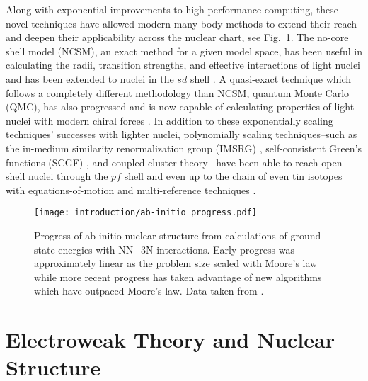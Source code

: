 \documentclass[../thesis.tex]{subfiles}
\begin{document}
Along with exponential improvements to high-performance computing, these novel techniques have allowed modern many-body methods to extend their reach and deepen their applicability across the nuclear chart, see Fig.\ \ref{fig:AbInitioProgress}.  The no-core shell model (NCSM), an exact method for a given model space, has been useful in calculating the radii, transition strengths, and effective interactions of light nuclei and has been extended to nuclei in the $sd$ shell \cite{NAVRATIL2000054311,NAVRATIL2009083101,BARRETT2013131}.  A quasi-exact technique which follows a completely different methodology than NCSM, quantum Monte Carlo (QMC), has also progressed and is now capable of calculating properties of light nuclei with modern chiral forces \cite{PUDLINER19971720,PIEPER200153,CARLSON20151067}.  In addition to these exponentially scaling techniques' successes with lighter nuclei, polynomially scaling techniques--such as the in-medium similarity renormalization group (IMSRG) \cite{TSUKIYAMA2011222502,TSUKIYAMA2012061304,HERGERT2013242501,BOGNER2014142501,HERGERT2014041302,HERGERT2017023002,STROBERG2016051301,STROBERG2017032502}, self-consistent Green's functions (SCGF) \cite{SOMA2013011303,SOMA2014024323,SOMA2014061301}, and coupled cluster theory \cite{WLOCH2005212501,WLOCH2005S1291,JANSEN2014142502,JANSEN2016011301,HAGEN2015186,KOWALSKI2004132501,GOUR2006024310,BINDER2013054319}--have been able to reach open-shell nuclei through the $pf$ shell and even up to the chain of even tin isotopes with equations-of-motion and multi-reference techniques \cite{MORRIS2017}.

\begin{figure}[h]
  \centering
  \texttt{[image: introduction/ab-initio\_progress.pdf]}
  \caption{Progress of ab-initio nuclear structure from calculations of ground-state energies with NN+3N interactions.  Early progress was approximately linear as the problem size scaled with Moore's law while more recent progress has taken advantage of new algorithms which have outpaced Moore's law.  Data taken from \cite{HERGERTPRIVATE}.}
  \label{fig:AbInitioProgress}
\end{figure}


\section{Electroweak Theory and Nuclear Structure}
\end{document}
